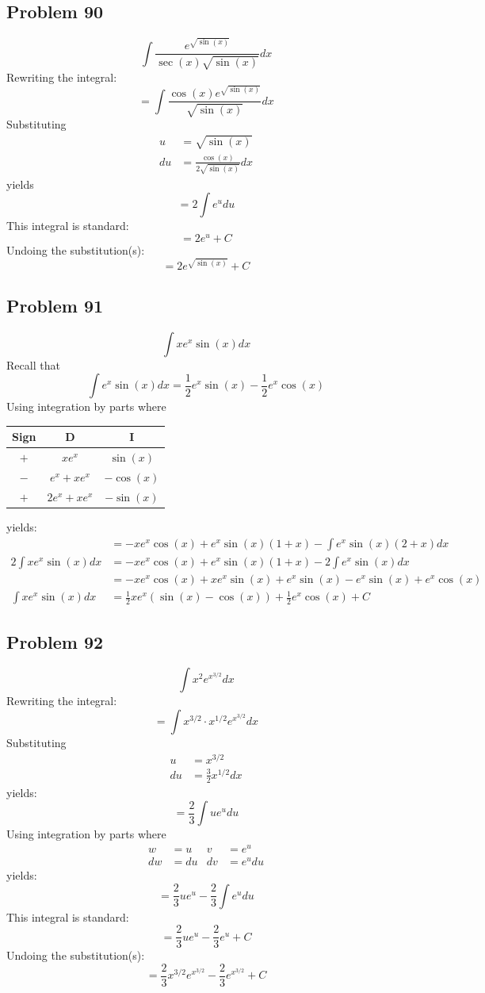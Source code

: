 \documentclass{article}
\begin{document}
\subsection*{Problem 90}
$$\int\frac{e^{\sqrt{\sin\left(x\right)}}}{\sec\left(x\right)\sqrt{\sin\left(x\right)}}dx$$
Rewriting the integral:
$$=\int\frac{\cos(x)e^{\sqrt{\sin(x)}}}{\sqrt{\sin(x)}}dx$$
Substituting
\begin{align*}
u&=\sqrt{\sin(x)} \\
du&=\frac{\cos(x)}{2\sqrt{\sin(x)}}dx
\end{align*}
yields
$$=2\int e^udu$$
This integral is standard:
$$=2e^u+C$$
Undoing the substitution(s):
$$=2e^{\sqrt{\sin(x)}}+C$$
\subsection*{Problem 91}
$$\int xe^x\sin(x)dx$$
Recall that
$$\int e^x\sin(x)dx=\frac{1}{2}e^x\sin(x)-\frac{1}{2}e^x\cos(x)$$
Using integration by parts where
\begin{center}
\begin{tabular}{ |c|c|c| } 
 \hline
 Sign & D & I \\
 \hline
 $+$ & $xe^x$ & $\sin(x)$ \\ 
 $-$ & $e^x+xe^x$ & $-\cos(x)$ \\
 $+$ & $2e^x+xe^x$ & $-\sin(x)$ \\
 \hline
\end{tabular}
\end{center}
yields:
\begin{align*}
&=-xe^x\cos(x)+e^x\sin(x)(1+x)-\int e^x\sin(x)(2+x)dx \\
2\int xe^x\sin(x)dx&=-xe^x\cos(x)+e^x\sin(x)(1+x)-2\int e^x\sin(x)dx \\
&=-xe^x\cos(x)+xe^x\sin(x)+e^x\sin(x)-e^x\sin(x)+e^x\cos(x) \\
\int xe^x\sin(x)dx&=\frac{1}{2}xe^x(\sin(x)-\cos(x))+\frac{1}{2}e^x\cos(x)+C
\end{align*}
\subsection*{Problem 92}
$$\int x^2e^{x^{3/2}}dx$$
Rewriting the integral:
$$=\int x^{3/2}\cdot x^{1/2}e^{x^{3/2}}dx$$
Substituting
\begin{align*}
u&=x^{3/2} \\
du&=\frac{3}{2}x^{1/2}dx
\end{align*}
yields:
$$=\frac{2}{3}\int ue^udu$$
Using integration by parts where
\begin{align*}
w&=u &v&=e^u \\
dw&=du &dv&=e^udu
\end{align*}
yields:
$$=\frac{2}{3}ue^u-\frac{2}{3}\int e^udu$$
This integral is standard:
$$=\frac{2}{3}ue^u-\frac{2}{3}e^u+C$$
Undoing the substitution(s):
$$=\frac{2}{3}x^{3/2}e^{x^{3/2}}-\frac{2}{3}e^{x^{3/2}}+C$$
\end{document}
